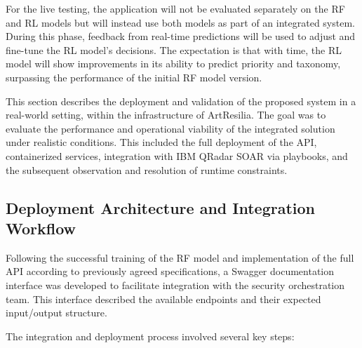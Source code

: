 For the live testing, the application will not be evaluated separately on the RF and RL models but will instead use both models as part of an integrated system. 
During this phase, feedback from real-time predictions will be used to adjust and fine-tune the RL model's decisions. 
The expectation is that with time, the RL model will show improvements in its ability to predict priority and taxonomy, surpassing the performance of the initial RF model version.

This section describes the deployment and validation of the proposed system in a real-world setting, within the infrastructure of ArtResilia. 
The goal was to evaluate the performance and operational viability of the integrated solution under realistic conditions. 
This included the full deployment of the API, containerized services, integration with IBM QRadar SOAR via playbooks, and the subsequent observation and resolution of runtime constraints.

\subsection{Deployment Architecture and Integration Workflow}

Following the successful training of the RF model and implementation of the full API according to previously agreed specifications, a Swagger documentation interface was developed to facilitate integration with the security orchestration team. 
This interface described the available endpoints and their expected input/output structure.

The integration and deployment process involved several key steps:


